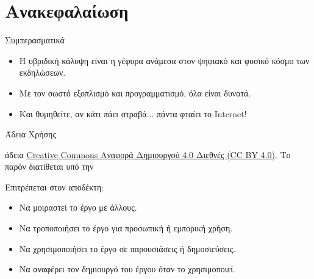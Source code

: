 \documentclass[aspectratio=169]{beamer}
\begin{document}
\section{Ανακεφαλαίωση}
\begin{frame}{Συμπερασματικά}
  \begin{itemize}
    \item Η υβριδική κάλυψη είναι η γέφυρα ανάμεσα στον ψηφιακό και φυσικό κόσμο των εκδηλώσεων.
    \item Με τον σωστό εξοπλισμό και προγραμματισμό, όλα είναι δυνατά.
    \item Και θυμηθείτε, αν κάτι πάει στραβά... πάντα φταίει το Internet!
  \end{itemize}
\end{frame}
\begin{frame}{Άδεια Χρήσης}
  \begin{center}
    \ccbysa
  \end{center}
  \begin{center}
    άδεια \href{https://creativecommons.org/licenses/by/4.0/}{Creative Commons Αναφορά Δημιουργού 4.0 Διεθνές (CC BY 4.0)}.  Το παρόν διατίθεται υπό την
    \ccbysa
  \end{center}
  \begin{exampleblock}{Επιτρέπεται στον αποδέκτη:}
    \begin{itemize}
      \item Να μοιραστεί το έργο με άλλους.
      \item Να τροποποιήσει το έργο για προσωπική ή εμπορική χρήση.
      \item Να χρησιμοποιήσει το έργο σε παρουσιάσεις ή δημοσιεύσεις.
      \item Να αναφέρει τον δημιουργό του έργου όταν το χρησιμοποιεί.

    \end{itemize}
  \end{exampleblock}
\end{frame}
\end{document}
